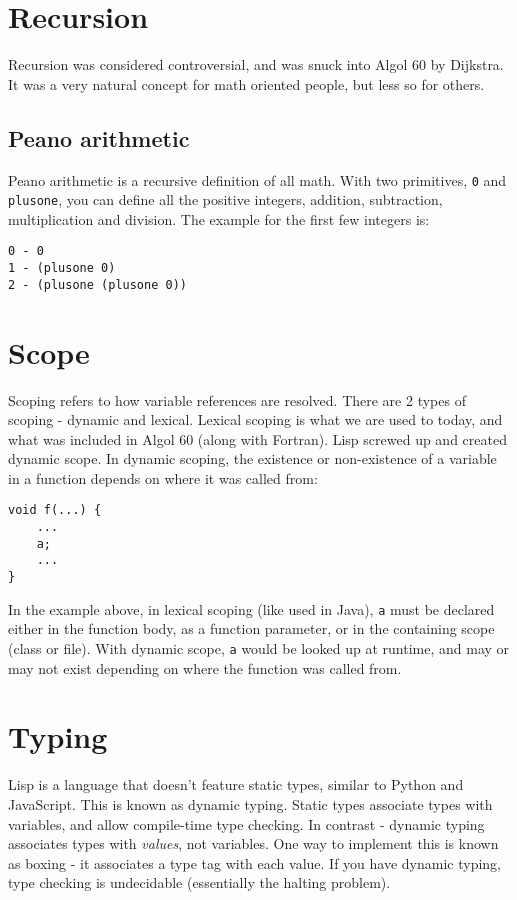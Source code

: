 \documentclass[twoside]{article}
\begin{document}
\section{Recursion}

Recursion was considered controversial, and was snuck into Algol 60 by
Dijkstra.  It was a very natural concept for math oriented people, but
less so for others.

\subsection{Peano arithmetic}

Peano arithmetic is a recursive definition of all math.  With two
primitives, \texttt{0} and \texttt{plusone}, you can define all the positive
integers, addition, subtraction, multiplication and division.  The
example for the first few integers is:
\begin{verbatim}
0 - 0
1 - (plusone 0)
2 - (plusone (plusone 0))
\end{verbatim}

\section{Scope}

Scoping refers to how variable references are resolved.  There are 2
types of scoping - dynamic and lexical.  Lexical scoping is what we
are used to today, and what was included in Algol 60 (along with
Fortran).  Lisp screwed up and created dynamic scope.  In dynamic
scoping, the existence or non-existence of a variable in a function
depends on where it was called from:

\begin{verbatim}
void f(...) {
    ...
    a;
    ...
}
\end{verbatim}

In the example above, in lexical scoping (like used in Java),
\texttt{a} must be declared either in the function body, as a function
parameter, or in the containing scope (class or file).  With dynamic
scope, \texttt{a} would be looked up at runtime, and may or may not
exist depending on where the function was called from.

\section{Typing}

Lisp is a language that doesn't feature static types, similar to
Python and JavaScript.  This is known as dynamic typing.  Static types
associate types with variables, and allow compile-time type checking.
In contrast - dynamic typing associates types with \emph{values}, not
variables.  One way to implement this is known as boxing - it
associates a type tag with each value.  If you have dynamic typing,
type checking is undecidable (essentially the halting problem).
\end{document}
